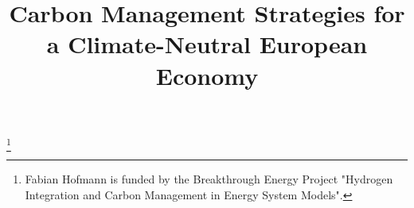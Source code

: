 \documentclass[conference]{IEEEtran}
\begin{document}
\title{Carbon Management Strategies for a Climate-Neutral European Economy}

\thanks{Fabian Hofmann is funded by the Breakthrough Energy Project "Hydrogen Integration and Carbon Management in Energy System Models".}

\author{
}

\maketitle
\end{document}
